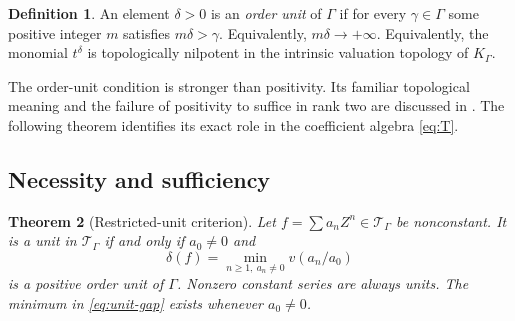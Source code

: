 \documentclass[11pt,letterpaper]{article}
\numberwithin{equation}{section}
\newtheorem{theorem}{Theorem}[section]
\theoremstyle{definition}
\newtheorem{definition}[theorem]{Definition}
\theoremstyle{remark}
\begin{document}
\begin{definition}
An element $\delta>0$ is an \emph{order unit} of $\Gamma$ if for every
$\gamma\in\Gamma$ some positive integer $m$ satisfies $m\delta>\gamma$.
Equivalently, $m\delta\to+\infty$. Equivalently, the monomial $t^\delta$
is topologically nilpotent in the intrinsic valuation topology of $K_\Gamma$.
\end{definition}

The order-unit condition is stronger than positivity. Its familiar topological
meaning and the failure of positivity to suffice in rank two are discussed in
\cite[Section~6.2]{Conrad}. The following theorem identifies its exact role
in the coefficient algebra \eqref{eq:T}.

\subsection{Necessity and sufficiency}
\begin{theorem}[Restricted-unit criterion]\label{thm:units}
Let $f=\sum a_nZ^n\in\mathcal T_\Gamma$ be nonconstant. It is a unit in
$\mathcal T_\Gamma$ if and only if $a_0\ne0$ and
\begin{equation}\label{eq:unit-gap}
 \delta(f)=\min_{n\ge1,\ a_n\ne0}v(a_n/a_0)
\end{equation}
is a positive order unit of $\Gamma$. Nonzero constant series are always
units. The minimum in \eqref{eq:unit-gap} exists whenever $a_0\ne0$.
\end{theorem}
\end{document}
